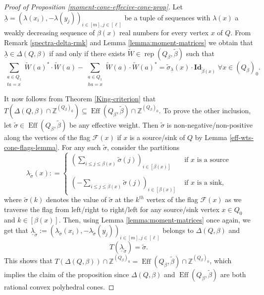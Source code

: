 \documentclass[11pt]{article}
\theoremstyle{definition}
\numberwithin{equation}{section}
\newcommand{\rep}{\operatorname{rep}}
\newcommand{\ZZ}{\mathbb Z}
\newcommand{\dsp}{\displaystyle}
\newcommand{\Id}{\mathbf{Id}}
\newcommand{\F}{\mathcal{F}}
\newcommand{\Eff}{\operatorname{Eff}}
\begin{document}
\begin{proof}[Proof of Proposition \ref{moment-cone-effecive-cone-prop}]
Let $\underline{\lambda} = (\lambda(x_i), -\lambda(y_j))_{i \in [m], j \in [\ell]}$ be a tuple of sequences with $\lambda(x)$ a weakly decreasing sequence of $\beta(x)$ real numbers for every vertex $x$ of $Q$. From Remark \ref{spectra-delta-rmk} and Lemma \ref{lemma:moment-matrices} we obtain that $\underline{\lambda} \in \Delta(Q, \beta)$ if and only if there exists $\widetilde{W} \in \rep(Q_\beta, \widetilde{\beta})$ such that 
	\[
	\sum_{\substack{a \in Q_1 \\ ta=x}} \widetilde{W}(a)^* \cdot \widetilde{W}(a) - \sum_{\substack{a \in Q_1 \\ ha=x}} \widetilde{W}(a) \cdot \widetilde{W}(a)^* = \widetilde{\sigma}_{\underline{\lambda}}(x) \cdot \Id_{\widetilde{\beta}(x)} \; \forall x \in (Q_\beta)_0.
	\]

It now follows from Theorem \ref{King-criterion} that $T\left(\Delta(Q,\beta) \cap \ZZ^{(Q_\beta)_0}\right) \subseteq \Eff(Q_\beta, \widetilde{\beta}) \cap \ZZ^{(Q_\beta)_0}$. To prove the other inclusion, let $\widetilde{\sigma} \in \Eff(Q_\beta,\widetilde{\beta})$ be any effective weight. Then $\widetilde{\sigma}$ is  non-negative/non-positive along the vertices of the flag $\F(x)$ if $x$ is a source/sink of $Q$ by Lemma \ref{eff-wts-cone-flags-lemma}. For any such $\widetilde{\sigma}$, consider the partitions
\[
\lambda_{\widetilde{\sigma}}(x) : = \begin{cases} 
\left( \dsp \sum_{i \leq j \leq \beta(x)} \widetilde{\sigma}(j) \right)_{i \in [\beta(x)]} & \mbox{ if } x \text{ is a source} \\
\\
\left( \dsp -\sum_{i \leq j \leq \beta(x)} \widetilde{\sigma}(j)\right)_{i \in [\beta(x)]} & \mbox{ if } x \text{ is a sink},
\end{cases}
\]
where $\widetilde{\sigma}(k)$ denotes the value of $\widetilde{\sigma}$ at the $k^{th}$ vertex of the flag $\F(x)$ as we traverse the flag from left/right to right/left for any source/sink vertex $x \in Q_0$ and $k \in [\beta(x)]$. Then, using Lemma \ref{lemma:moment-matrices} once again, we get that $\underline{\lambda}_{\widetilde{\sigma}}:=(\lambda_{\widetilde{\sigma}}(x_i), -\lambda_{\widetilde{\sigma}}(y_j))_{i \in [m], j\in [\ell]}$ belongs to $\Delta(Q, \beta)$ and
$$
T(\underline{\lambda}_{\widetilde{\sigma}}) = \widetilde{\sigma}.
$$
This shows that 
$T(\Delta(Q,\beta)) \cap \ZZ^{(Q_\beta)_0} = \Eff(Q_\beta, \widetilde{\beta}) \cap \ZZ^{(Q_\beta)_0}$, which implies the claim of the proposition since $\Delta(Q,\beta)$ and $\Eff(Q_\beta,\widetilde{\beta})$ are both rational convex polyhedral cones.
\end{proof}
\end{document}
